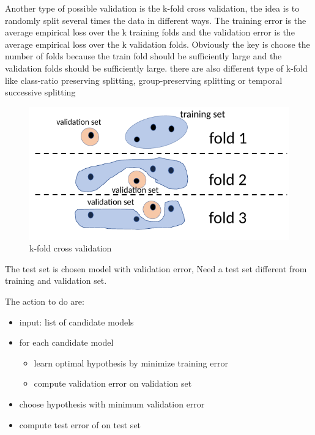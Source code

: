 Another type of possible validation is the k-fold cross validation, the idea is to randomly split several times the data in different ways. The training error is the average empirical loss over the k training folds and the validation error is the average empirical loss over the k validation folds. Obviously the key is choose the number of folds because the train fold should be sufficiently large and the validation folds should be sufficiently large. there are also different type of k-fold like class-ratio preserving splitting, group-preserving splitting or temporal successive splitting

\begin{figure}[H]
    \centering
    \includegraphics[scale=0.4]{images/MVS/MVS3.png}
    \caption{k-fold cross validation}
    \label{fig:enter-label}
\end{figure}

The test set is chosen model with validation error, Need a test set different from training and validation set.

The action to do are: 
\begin{itemize}
    \item input: list of candidate models
    \item  for each candidate model
        \begin{itemize}
            \item learn optimal hypothesis by minimize training error
            \item compute validation error on validation set
        \end{itemize}
    \item choose hypothesis with minimum validation error
    \item  compute test error of on test set
\end{itemize}